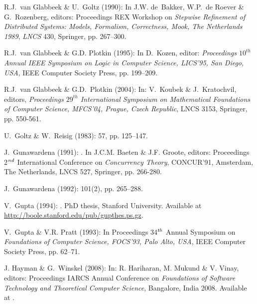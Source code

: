\documentclass[twocolumn]{article}
\begin{document}
\begin{thebibliography}{10}
{\sc R.J.~van Glabbeek \& U.~Goltz} (1990):
\newblock In J.W. de~Bakker, W.P.~de Roever \& G.~Rozenberg, editors:
{Proceedings REX Workshop on \sl Stepwise Refinement of Distributed
Systems: Models, Formalism, Correctness, {\rm Mook, The Netherlands 1989}},
{\sl \rm LNCS} 430, Springer, pp. 267--300.

{\sc R.J.~van Glabbeek \& G.D. Plotkin} (1995):
\newblock In D.~Kozen, editor: {\sl {\rm Proceedings $10^{th}$ Annual IEEE Symposium on} Logic in Computer Science, {\rm LICS'95, San Diego, USA}}, IEEE Computer Society Press, pp. 199--209.

{\sc R.J.~van Glabbeek \& G.D.~Plotkin} (2004):
\newblock In: V.~Koubek \& J.~Kratochvil, editors, {\sl {\rm Proceedings
  $29^{th}$ International Symposium on} Mathematical Foundations of Computer
  Science, {\rm MFCS'04, Prague, Czech Republic}}, LNCS 3153,
  Springer, pp. 550-561.

{\sc U.~Goltz \& W.~Reisig} (1983):
 57, pp. 125--147.

{\sc J.~Gunawardena} (1991):
.
\newblock In J.C.M. Baeten \& J.F. Groote, editors: Proceedings 2$^{\it
  nd}$ International Conference on {\sl Concurrency Theory},
  CONCUR'91, Amsterdam, The Netherlands, LNCS 527, Springer, pp. 266-280.

{\sc J.~Gunawardena} (1992):
 101(2), pp. 265--288.

{\sc V.~Gupta} (1994):
.
\newblock PhD thesis, Stanford University.
\newblock Available at \url{http://boole.stanford.edu/pub/gupthes.ps.gz}.

{\sc V.~Gupta \& V.R. Pratt} (1993):
\newblock In {Proceedings 34$^{\it th}$ Annual Symposium on \sl
Foundations of Computer Science\rm, FOCS'93, Palo Alto, USA}, IEEE
Computer Society Press, pp. 62--71.

{\sc J. Hayman \& G.~Winskel} (2008):
\newblock In: R. Hariharan, M. Mukund \& V. Vinay, editors:
 Proceedings IARCS Annual Conference on
 {\sl Foundations of Software Technology and Theoretical Computer
Science}, Bangalore, India 2008.
\newblock Available at .


\end{thebibliography}
\end{document}
